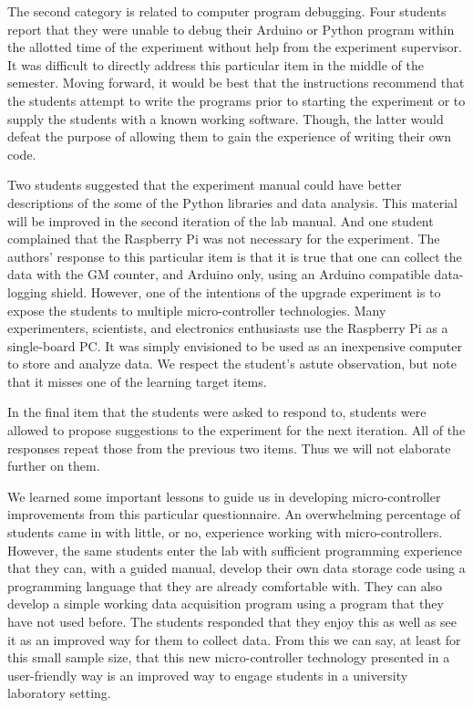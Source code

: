 The second category is related to computer program debugging.
Four students report that they were unable to debug their Arduino or Python program within the allotted time of the experiment without help from the experiment supervisor.
It was difficult to directly address this particular item in the middle of the semester.
Moving forward, it would be best that the instructions recommend that the students attempt to write the programs prior to starting the experiment or to supply the students with a known working software.
Though, the latter would defeat the purpose of allowing them to gain the experience of writing their own code.

Two students suggested that the experiment manual could have better descriptions of the some of the Python libraries and data analysis.
This material will be improved in the second iteration of the lab manual.
And one student complained that the Raspberry Pi was not necessary for the experiment.
The authors' response to this particular item is that it is true that one can collect the data with the GM counter, and Arduino only, using an Arduino compatible data-logging shield.
However, one of the intentions of the upgrade experiment is to expose the students to multiple micro-controller technologies.
Many experimenters, scientists, and electronics enthusiasts use the Raspberry Pi as a single-board PC.
It was simply envisioned to be used as an inexpensive computer to store and analyze data.
We respect the student's astute observation, but note that it misses one of the learning target items.

In the final item that the students were asked to respond to, students were allowed to propose suggestions to the experiment for the next iteration.
All of the responses repeat those from the previous two items. Thus we will not elaborate further on them.

We learned some important lessons to guide us in developing micro-controller improvements from this particular questionnaire.
An overwhelming percentage of students came in with little, or no, experience working with micro-controllers.
However, the same students enter the lab with sufficient programming experience that they can, with a guided manual, develop their own data storage code using a programming language that they are already comfortable with.
They can also develop a simple working data acquisition program using a program that they have not used before.
The students responded that they enjoy this as well as see it as an improved way for them to collect data.
From this we can say, at least for this small sample size, that this new micro-controller technology presented in a user-friendly way is an improved way to engage students in a university laboratory setting.

